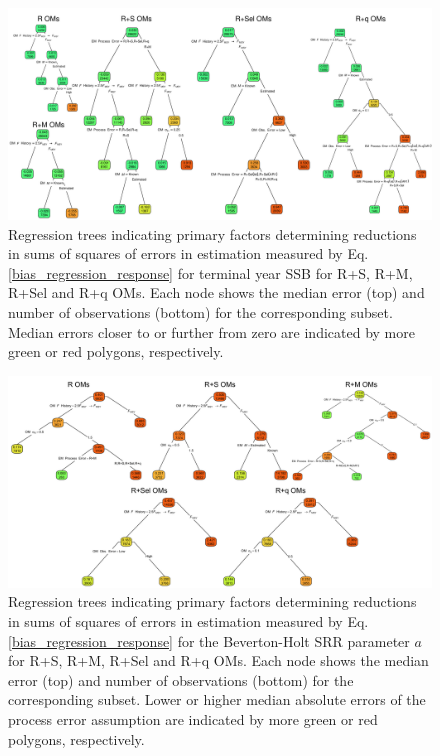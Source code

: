 \documentclass[
  12pt,
]{article}
\begin{document}
\begin{landscape}
\begin{figure}
\begin{center}
\includegraphics[width = 1.4\textwidth]{SSB_bias_regtree_plots}
\end{center}
\caption{Regression trees indicating primary factors determining reductions in sums of squares of errors in estimation measured by Eq. \ref{bias_regression_response} for terminal year SSB for R+S, R+M, R+Sel and R+q OMs. Each node shows the median error (top) and number of observations (bottom) for the corresponding subset. Median errors closer to or further from zero are indicated by more green or red polygons, respectively.}\label{SSB_bias_regtree}
\end{figure}
\end{landscape}

\begin{landscape}
\begin{figure}
\begin{center}
\includegraphics[width = 1.4\textwidth]{SR_a_bias_regtree_plots}
\end{center}
\caption{Regression trees indicating primary factors determining reductions in sums of squares of errors in estimation measured by Eq. \ref{bias_regression_response} for the Beverton-Holt SRR parameter $a$ for R+S, R+M, R+Sel and R+q OMs. Each node shows the median error (top) and number of observations (bottom) for the corresponding subset. Lower or higher median absolute errors of the process error assumption are indicated by more green or red polygons, respectively.}\label{SR_a_bias_regtree}
\end{figure}
\end{landscape}
\end{document}

